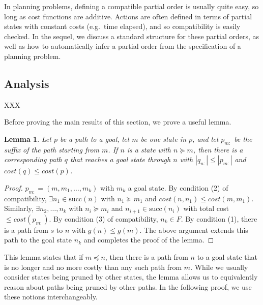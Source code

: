 \documentclass[letterpaper]{article}
\theoremstyle{plain} \newtheorem{theorem}{Theorem} \newtheorem{proposition}{Proposition} \newtheorem{lemma}{Lemma}
\theoremstyle{definition} \newtheorem{definition}{Definition} \newtheorem{conjecture}{Conjecture} \newtheorem*{example}{Example}
\theoremstyle{remark} \newtheorem*{remark}{Remark} \newtheorem*{note}{Note} \newtheorem{case}{Case}
\begin{document}
In planning problems, defining a compatible partial order is usually
quite easy, so long as cost functions are additive.  Actions are
often defined in terms of partial states with constant costs (e.g.\
time elapsed), and so compatibility is easily checked.  In the
sequel, we discuss a standard structure for these partial orders,
as well as how to automatically infer a partial order from the
specification of a planning problem.

\subsection{Analysis}

XXX

Before proving the main results of this section, we prove a useful lemma. 

\begin{lemma}{}\label{clm-complete-lemma}
  Let $p$ be a path to a goal, let $m$ be one state in $p$, and let 
$p_{m:}$ be the suffix of the path starting from $m$. If $n$ is a state
with $n \succeq m$, then there is a corresponding path $q$ that reaches a goal state
through $n$ with $|q_{n:}| \leq |p_{m:}|$ and $cost(q) \leq cost(p)$.
\end{lemma}
\begin{proof}
$p_{m:}=(m,m_{1},\dots,m_{k})$ with $m_{k}$ a goal state.
By condition (2) of compatibility, $\exists n_{1} \in \mathrm{succ}(n)$ 
with $n_{1} \succeq m_{1}$ and $cost(n,n_{1}) \leq cost(m,m_{1})$. 
Similarly, $\exists n_{2},\dots,n_{k}$ with 
$n_{i} \succeq m_{i}$ and $n_{i+1} \in \mathrm{succ}(n_{i})$ with 
total cost $\leq cost(p_{m:})$.
By condition (3) of compatibility, $n_{k} \in F$. By condition (1),
there is a path from $s$ to $n$ with $g(n) \leq g(m)$. The above argument extends this path
to the goal state $n_{k}$ and completes the proof of the lemma.
\end{proof}

This lemma states that if $m \preceq n$, then there is a path from $n$ to a goal
state that is no longer and no more costly than any such path from $m$.
While we usually consider states being pruned by other states, the lemma
allows us to equivalently reason about paths being pruned by other paths.
In the following proof, we use these notions interchangeably.
\end{document}

